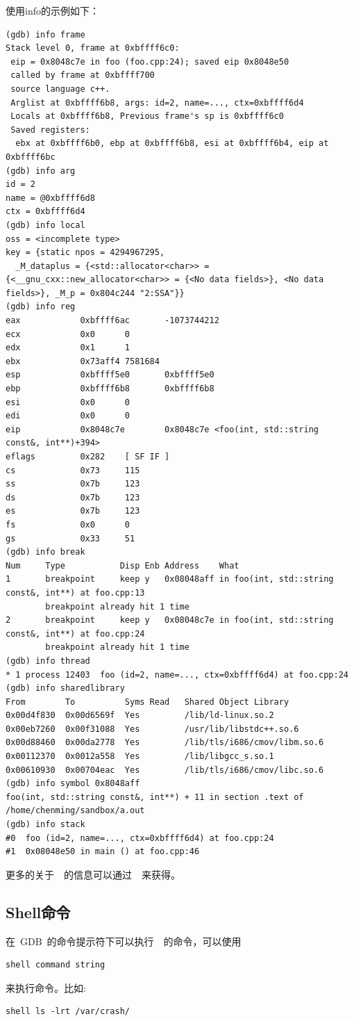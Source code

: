 使用info的示例如下：
\begin{lstlisting}
(gdb) info frame
Stack level 0, frame at 0xbffff6c0:
 eip = 0x8048c7e in foo (foo.cpp:24); saved eip 0x8048e50
 called by frame at 0xbffff700
 source language c++.
 Arglist at 0xbffff6b8, args: id=2, name=..., ctx=0xbffff6d4
 Locals at 0xbffff6b8, Previous frame's sp is 0xbffff6c0
 Saved registers:
  ebx at 0xbffff6b0, ebp at 0xbffff6b8, esi at 0xbffff6b4, eip at 0xbffff6bc
(gdb) info arg
id = 2
name = @0xbffff6d8
ctx = 0xbffff6d4
(gdb) info local
oss = <incomplete type>
key = {static npos = 4294967295,
  _M_dataplus = {<std::allocator<char>> = {<__gnu_cxx::new_allocator<char>> = {<No data fields>}, <No data fields>}, _M_p = 0x804c244 "2:SSA"}}
(gdb) info reg
eax            0xbffff6ac       -1073744212
ecx            0x0      0
edx            0x1      1
ebx            0x73aff4 7581684
esp            0xbffff5e0       0xbffff5e0
ebp            0xbffff6b8       0xbffff6b8
esi            0x0      0
edi            0x0      0
eip            0x8048c7e        0x8048c7e <foo(int, std::string const&, int**)+394>
eflags         0x282    [ SF IF ]
cs             0x73     115
ss             0x7b     123
ds             0x7b     123
es             0x7b     123
fs             0x0      0
gs             0x33     51
(gdb) info break
Num     Type           Disp Enb Address    What
1       breakpoint     keep y   0x08048aff in foo(int, std::string const&, int**) at foo.cpp:13
        breakpoint already hit 1 time
2       breakpoint     keep y   0x08048c7e in foo(int, std::string const&, int**) at foo.cpp:24
        breakpoint already hit 1 time
(gdb) info thread
* 1 process 12403  foo (id=2, name=..., ctx=0xbffff6d4) at foo.cpp:24
(gdb) info sharedlibrary
From        To          Syms Read   Shared Object Library
0x00d4f830  0x00d6569f  Yes         /lib/ld-linux.so.2
0x00eb7260  0x00f31088  Yes         /usr/lib/libstdc++.so.6
0x00d88460  0x00da2778  Yes         /lib/tls/i686/cmov/libm.so.6
0x00112370  0x0012a558  Yes         /lib/libgcc_s.so.1
0x00610930  0x00704eac  Yes         /lib/tls/i686/cmov/libc.so.6
(gdb) info symbol 0x8048aff
foo(int, std::string const&, int**) + 11 in section .text of /home/chenming/sandbox/a.out
(gdb) info stack
#0  foo (id=2, name=..., ctx=0xbffff6d4) at foo.cpp:24
#1  0x08048e50 in main () at foo.cpp:46
\end{lstlisting}

更多的关于~~的信息可以通过~~来获得。

\subsection{Shell命令}
在~GDB~的命令提示符下可以执行~~的命令，可以使用
\begin{lstlisting}
shell command string
\end{lstlisting}
来执行命令。比如:
\begin{lstlisting}
shell ls -lrt /var/crash/
\end{lstlisting}

